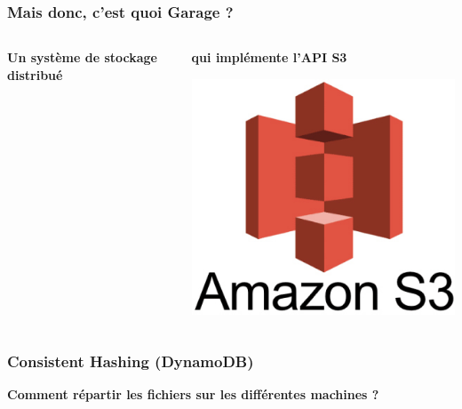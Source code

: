 \documentclass[aspectratio=169]{beamer}
\begin{document}
\begin{frame}
	\frametitle{Mais donc, c'est quoi Garage ?}

	\begin{columns}[t]
	\begin{column}{0.5\textwidth}
		\centering
		\textbf{Un système de stockage distribué}
		\vspace{1em}

			\def\svgwidth{.7\columnwidth}
			
	\end{column}
	\pause

	\begin{column}{0.5\textwidth}
		\centering
		\textbf{qui implémente l'API S3}
		\vspace{2em}

		\includegraphics[width=.7\columnwidth]{img/Amazon-S3.jpg}
	\end{column}
	\end{columns}
\end{frame}

\begin{frame}
	\frametitle{Consistent Hashing (DynamoDB)}
	\textbf{Comment répartir les fichiers sur les différentes machines ?}
	\vspace{1em}

	\centering

\end{frame}
\end{document}
